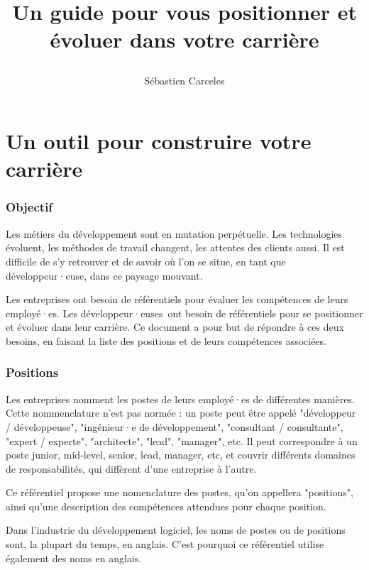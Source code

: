 \documentclass[a4paper, french, openany, 12pt]{book}
\title{
  \vspace*{-8cm}

  \fullwidthimage{images/cover.jpg}

  \vspace*{5cm}

  \bsc{Référenciel de compétences pour développeurs et développeuses}

  Un guide pour vous positionner et évoluer dans votre carrière
}
\author{Sébastien Carceles}
\date{}
\newcommand\dev{développeur·euse}
\newcommand\devs{développeur·euses}
\begin{document}
\begin{titlepage}
  \maketitle
\end{titlepage}

\mainmatter

\part{Un outil pour construire  votre carrière}

\begin{multicols}{2}
  
  \section*{Objectif}
  
  Les métiers du développement sont en mutation perpétuelle.
  Les technologies évoluent, les méthodes de travail changent, les attentes des clients aussi.
  Il est difficile de s'y retrouver et de savoir où l'on se situe, en tant que \dev, dans ce paysage mouvant.
  
  Les entreprises ont besoin de référentiels pour évaluer les compétences de leurs employé·es.
  Les \devs\ ont besoin de référentiels pour se positionner et évoluer dans leur carrière.
  Ce document a pour but de répondre à ces deux besoins, en faisant la liste des positions et de leurs compétences
  associées.
  
  \section*{Positions}
  
  Les entreprises nomment les postes de leurs employé·es de différentes manières.
  Cette nommenclature n'est pas normée : un poste peut être appelé "développeur / développeuse", "ingénieur·e de 
  développement", "consultant / consultante", "expert / experte", "architecte", "lead", "manager", etc.
  Il peut correspondre à un poste junior, mid-level, senior, lead, manager, etc, et couvrir différents domaines de 
  responsabilités, qui diffèrent d'une entreprise à l'autre.
  
  Ce référentiel propose une nomenclature des postes, qu'on appellera "positions",
  ainsi qu'une description des compétences attendues pour chaque position.
  
  Dans l'industrie du développement logiciel, les noms de postes ou de positions sont, la plupart du temps, en anglais.
  C'est pourquoi ce référentiel utilise également des noms en anglais.


\end{multicols}
\end{document}
